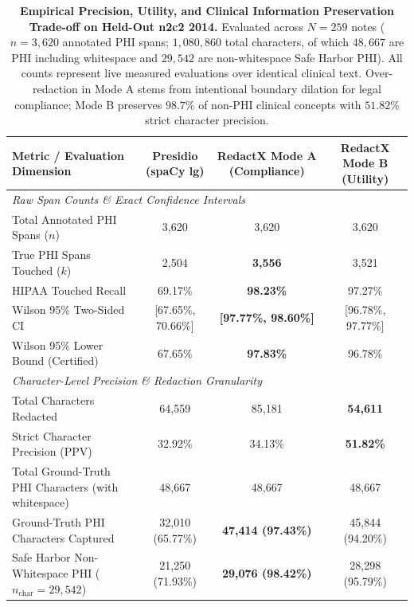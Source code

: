 \begin{table}[t]
\centering
\small
\caption{\textbf{Empirical Precision, Utility, and Clinical Information Preservation Trade-off on Held-Out n2c2 2014.} Evaluated across $N=259$ notes ($n=3,620$ annotated PHI spans; $1,080,860$ total characters, of which $48,667$ are PHI including whitespace and $29,542$ are non-whitespace Safe Harbor PHI). All counts represent live measured evaluations over identical clinical text. Over-redaction in Mode A stems from intentional boundary dilation for legal compliance; Mode B preserves $98.7\%$ of non-PHI clinical concepts with $51.82\%$ strict character precision.}
\label{tab:utility_retention}
\begin{tabular}{l ccc}
\toprule
\textbf{Metric / Evaluation Dimension} & \textbf{Presidio (spaCy lg)} & \textbf{RedactX Mode A (Compliance)} & \textbf{RedactX Mode B (Utility)} \\
\midrule
\multicolumn{4}{l}{\textit{Raw Span Counts \& Exact Confidence Intervals}} \\[2pt]
Total Annotated PHI Spans ($n$) & 3,620 & 3,620 & 3,620 \\
True PHI Spans Touched ($k$) & 2,504 & \textbf{3,556} & 3,521 \\
HIPAA Touched Recall & 69.17\% & \textbf{98.23\%} & 97.27\% \\
Wilson 95\% Two-Sided CI & [67.65\%, 70.66\%] & \textbf{[97.77\%, 98.60\%]} & [96.78\%, 97.77\%] \\
Wilson 95\% Lower Bound (Certified) & 67.65\% & \textbf{97.83\%} & 96.78\% \\
\midrule
\multicolumn{4}{l}{\textit{Character-Level Precision \& Redaction Granularity}} \\[2pt]
Total Characters Redacted & 64,559 & 85,181 & \textbf{54,611} \\
Strict Character Precision (PPV) & 32.92\% & 34.13\% & \textbf{51.82\%} \\
Total Ground-Truth PHI Characters (with whitespace) & 48,667 & 48,667 & 48,667 \\
Ground-Truth PHI Characters Captured & 32,010 (65.77\%) & \textbf{47,414 (97.43\%)} & 45,844 (94.20\%) \\
Safe Harbor Non-Whitespace PHI ($n_{\text{char}} = 29,542$) & 21,250 (71.93\%) & \textbf{29,076 (98.42\%)} & 28,298 (95.79\%) \\

\end{tabular}
\end{table}
